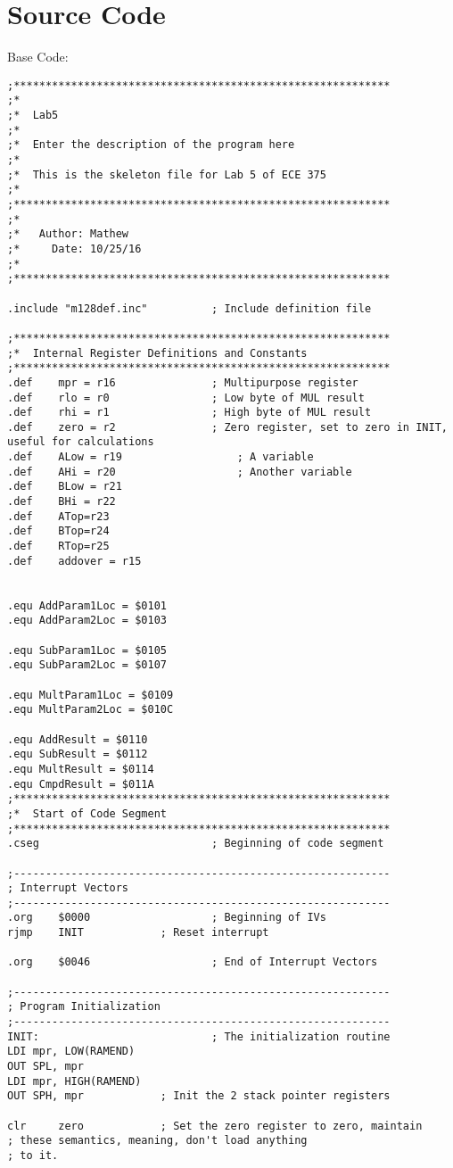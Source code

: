 \documentclass[12pt,letterpaper]{article}
\begin{document}
\section{Source Code}
Base Code:
\begin{verbatim}
;***********************************************************
;*
;*	Lab5
;*
;*	Enter the description of the program here
;*
;*	This is the skeleton file for Lab 5 of ECE 375
;*
;***********************************************************
;*
;*	 Author: Mathew
;*	   Date: 10/25/16
;*
;***********************************************************

.include "m128def.inc"			; Include definition file

;***********************************************************
;*	Internal Register Definitions and Constants
;***********************************************************
.def	mpr = r16				; Multipurpose register 
.def	rlo = r0				; Low byte of MUL result
.def	rhi = r1				; High byte of MUL result
.def	zero = r2				; Zero register, set to zero in INIT, useful for calculations
.def	ALow = r19					; A variable
.def	AHi = r20					; Another variable
.def	BLow = r21
.def	BHi = r22
.def	ATop=r23
.def	BTop=r24
.def	RTop=r25
.def	addover = r15


.equ AddParam1Loc = $0101
.equ AddParam2Loc = $0103

.equ SubParam1Loc = $0105
.equ SubParam2Loc = $0107

.equ MultParam1Loc = $0109
.equ MultParam2Loc = $010C

.equ AddResult = $0110
.equ SubResult = $0112
.equ MultResult = $0114
.equ CmpdResult = $011A
;***********************************************************
;*	Start of Code Segment
;***********************************************************
.cseg							; Beginning of code segment

;-----------------------------------------------------------
; Interrupt Vectors
;-----------------------------------------------------------
.org	$0000					; Beginning of IVs
rjmp 	INIT			; Reset interrupt

.org	$0046					; End of Interrupt Vectors

;-----------------------------------------------------------
; Program Initialization
;-----------------------------------------------------------
INIT:							; The initialization routine
LDI mpr, LOW(RAMEND)
OUT SPL, mpr
LDI mpr, HIGH(RAMEND)
OUT SPH, mpr			; Init the 2 stack pointer registers

clr		zero			; Set the zero register to zero, maintain
; these semantics, meaning, don't load anything
; to it.


\end{verbatim}
\end{document}
